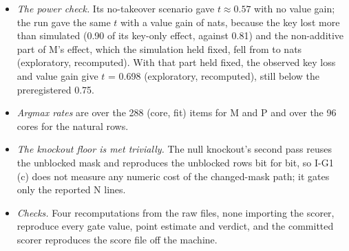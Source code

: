 \begin{itemize}
  \item \emph{The power check.} Its no-takeover scenario gave $t \approx 0.57$ with no value gain; the run gave the same $t$ with a value gain of \IfiveDV{} nats, because the key lost more than simulated (0.90 of its key-only effect, against 0.81) and the non-additive part of M's effect, which the simulation held fixed, fell from \InonAddU{} to \InonAddA{} nats (exploratory, recomputed). With that part held fixed, the observed key loss and value gain give $t$ = 0.698 (exploratory, recomputed), still below the preregistered 0.75.
  \item \emph{Argmax rates} are over the 288 (core, fit) items for M and P and over the 96 cores for the natural rows.
  \item \emph{The knockout floor is met trivially.} The null knockout's second pass reuses the unblocked mask and reproduces the unblocked rows bit for bit, so I-G1 (c) does not measure any numeric cost of the changed-mask path; it gates only the reported N lines.
  \item \emph{Checks.} Four recomputations from the raw files, none importing the scorer, reproduce every gate value, point estimate and verdict, and the committed scorer reproduces the score file off the machine.
\end{itemize}


